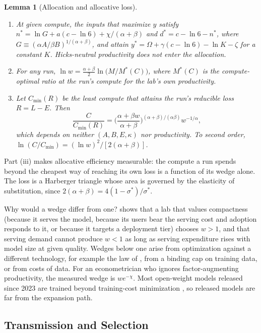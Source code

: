 \documentclass[AER,finalmode]{AEA}
\newtheorem{lemma}{Lemma}
\theoremstyle{definition}
\theoremstyle{remark}
\begin{document}
\begin{lemma}[Allocation and allocative loss]\label{lem:alloc}
\begin{enumerate}
\item[(i)] At given compute, the inputs that maximize $y$ satisfy
$n^*=\ln G+a(c-\ln6)+\chi/(\alpha+\beta)$ and $d^*=c-\ln6-n^*$, where $G\equiv(\alpha A/\beta B)^{1/(\alpha+\beta)}$,
and attain $y^*=\Omega+\gamma(c-\ln6)-\ln K-\zeta$ for a constant $K$. Hicks-neutral productivity does not enter the
allocation.
\item[(ii)] For any run, $\ln w=\tfrac{\alpha+\beta}{2}\ln\big(M/M^*(C)\big)$, where $M^*(C)$ is the compute-optimal
ratio at the run's compute for the lab's own productivity.
\item[(iii)] Let $C_{\min}(R)$ be the least compute that attains the run's reducible loss $R=L-E$. Then
\begin{equation}\label{eq:ce}
\frac{C}{C_{\min}(R)}=\Big(\frac{\alpha+\beta w}{\alpha+\beta}\Big)^{(\alpha+\beta)/(\alpha\beta)}w^{-1/\alpha},
\end{equation}
which depends on neither $(A,B,E,\kappa)$ nor productivity. To second order,
$\ln(C/C_{\min})=(\ln w)^2/[2(\alpha+\beta)]$.
\end{enumerate}
\end{lemma}

Part (iii) makes allocative efficiency measurable: the compute a run spends beyond the cheapest way of reaching its own
loss is a function of its wedge alone. The loss is a Harberger triangle whose area is governed by the elasticity of
substitution, since $2(\alpha+\beta)=4(1-\sigma^*)/\sigma^*$.

Why would a wedge differ from one? \citet[Proposition 1]{okar2026what} shows that a lab that values compactness (because
it serves the model, because its users bear the serving cost and adoption responds to it, or because it targets a
deployment tier) chooses $w>1$, and that serving demand cannot produce $w<1$ as long as serving expenditure rises with
model size at given quality. Wedges below one arise from optimization against a different technology, for example the
law of \citet{kaplan2020scaling}, from a binding cap on training data, or from costs of data. For an econometrician who
ignores factor-augmenting productivity, the measured wedge is $we^{-\chi}$. Most open-weight models released since 2023
are trained beyond training-cost minimization \citep{okar2026what}, so released models are far from the expansion
path.

\subsection{Transmission and Selection}\label{sec:transmission}
\end{document}
